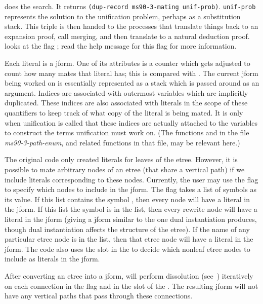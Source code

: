  does the search. It returns 
{\tt (dup-record ms90-3-mating unif-prob)}.
{\tt unif-prob} represents the solution to the unification problem, perhaps
as a substitution stack.
This triple is then handed to the processes that translate things back to
an expansion proof, call merging, and then translate to 
a natural deduction proof.
 looks at the flag ; read
the help message for this flag for more information.

Each literal is a jform. One of its attributes is a counter
which gets adjusted to count how many mates that literal has; this is
compared with .
The current jform being worked on is
essentially represented as a stack which is passed around as an 
argument. Indices are associated
with outermost variables which are implicitly duplicated. These
indices are also associated with literals in the scope of these
quantifiers to keep track of what copy of the literal is being mated.
It is only when unification is called that these indices are actually
attached to the variables to construct the terms unification must work
on.  (The functions  and  in 
the file {\it ms90-3-path-enum}, and
related functions in that file, may be relevant here.)

The original code only created literals for leaves of the etree.
However, it is possible to mate arbitrary nodes of an etree (that share a vertical path)
if we include literals corresponding to these nodes.
Currently, the user may use the flag  to specify
which nodes to include in the jform.  The flag  takes
a list of symbols as its value.  If this list contains the symbol ,
then every node will have a literal in the jform.  If this list the symbol 
is in the list, then every rewrite node will have a literal in the jform (giving a jform
similar to the one dual instantiation produces, though dual instantiation affects the
structure of the etree).  If the name of any particular etree node is in the list, then
that etree node will have a literal in the jform.
The code also uses the slot  in the 
to decide which nonleaf etree nodes to include as literals in the jform.

After converting an etree into a jform, \TPS will perform dissolution (see~\cite{Murray93}) iteratively
on each connection in the flag  and in the  slot
of the .  The resulting jform will not have any vertical paths
that pass through these connections.

